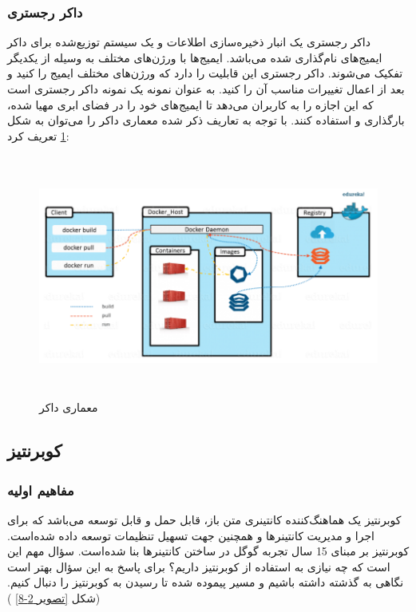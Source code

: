 \subsubsection*{داکر رجستری}

داکر رجستری یک انبار ذخیره‌سازی اطلاعات و یک سیستم توزیع‌شده برای داکر ایمیج‌های نام‌گذاری شده می‌باشد. ایمیج‌ها با ورژن‌های مختلف به وسیله 
از یکدیگر تفکیک می‌شوند. داکر رجستری این قابلیت را دارد که ورژن‌های مختلف ایمیج را
کنید و بعد از اعمال تغییرات مناسب آن را 
کنید. به عنوان نمونه 
یک نمونه داکر رجستری است که این اجازه را به کاربران می‌دهد تا ایمیج‌های خود را در فضای ابری مهیا شده، بارگذاری و استفاده کنند.
\newline
\newline
با توجه به تعاریف ذکر شده معماری داکر را می‌توان به شکل 
\ref{تصویر 2-7}
تعریف کرد:
\begin{figure}[!h]
	\centering
	\includegraphics[height=8cm]{fig2-7}
	\caption{معماری داکر}
	\label{تصویر 2-7}
\end{figure}


\subsection{کوبرنتیز}

\subsubsection{مفاهیم اولیه}

کوبرنتیز یک هماهنگ‌کننده کانتینری متن باز، قابل حمل و قابل توسعه می‌باشد که برای اجرا و مدیریت کانتینرها و همچنین جهت تسهیل تنظیمات توسعه داده شده‌است. کوبرنتیز بر مبنای 15 سال تجربه گوگل در ساختن کانتینرها بنا شده‌است.
سؤال مهم این است که چه نیازی به استفاده از کوبرنتیز داریم؟ برای پاسخ به این سؤال بهتر است نگاهی به گذشته داشته باشیم و مسیر پیموده شده تا رسیدن به کوبرنتیز را دنبال کنیم.(شکل
\ref{تصویر 2-8}
)

